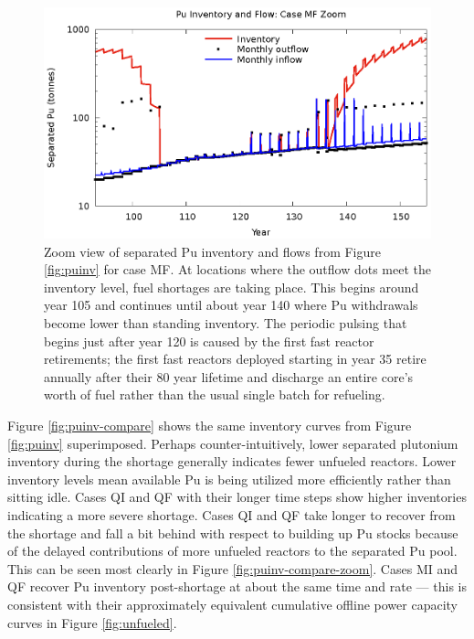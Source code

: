 \documentclass{style}
\begin{document}
\begin{figure}[!h]
    \centering
    \includegraphics[width=1.0\textwidth]{exp2/puinv-MF.eps}
    \caption[Separated Pu inventory and flow: Case MF Zoom]{
        Zoom view of separated Pu inventory and flows from Figure \ref{fig:puinv} for case MF.  At locations where the
        outflow dots meet the inventory level, fuel shortages are taking
        place.  This begins around year 105 and continues until about year 140
        where Pu withdrawals become lower than standing inventory.  The
        periodic pulsing that begins just after year 120 is caused by the
        first fast reactor retirements; the first fast reactors deployed starting in
        year 35 retire annually after their 80 year lifetime and discharge an entire core's
        worth of fuel rather than the usual single batch for refueling.
    }
    \label{fig:puinv-MF}
\end{figure}

Figure \ref{fig:puinv-compare} shows the same inventory curves from Figure
\ref{fig:puinv} superimposed. Perhaps counter-intuitively, lower separated
plutonium inventory during the shortage generally indicates fewer unfueled
reactors.  Lower inventory levels mean available Pu is being utilized more
efficiently rather than sitting idle.  Cases QI and QF with their longer time
steps show higher inventories indicating a more severe shortage.  Cases QI and
QF take longer to recover from the shortage and fall a bit behind with respect
to building up Pu stocks because of the delayed contributions of more unfueled
reactors to the separated Pu pool.  This can be seen most clearly in Figure
\ref{fig:puinv-compare-zoom}.  Cases MI and QF recover Pu inventory
post-shortage at about the same time and rate --- this is consistent with their
approximately equivalent cumulative offline power capacity curves in Figure
\ref{fig:unfueled}.
\end{document}
